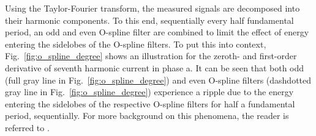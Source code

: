 Using the Taylor-Fourier transform, the measured signals are decomposed into their harmonic components. To this end, sequentially every half fundamental period, an odd and even O-spline filter are combined to limit the effect of energy entering the sidelobes of the O-spline filters. To put this into context, Fig.~\ref{fig:o_spline_degree} shows an illustration for the zeroth- and first-order derivative of seventh harmonic current in phase a. It can be seen that both odd (full gray line in Fig.~\ref{fig:o_spline_degree}) and even O-spline filters (dashdotted gray line in Fig.~\ref{fig:o_spline_degree}) experience a ripple due to the energy entering the sidelobes of the respective O-spline filters for half a fundamental period, sequentially. For more background on this phenomena, the reader is referred to \cite{delaOserna_2018}. 

